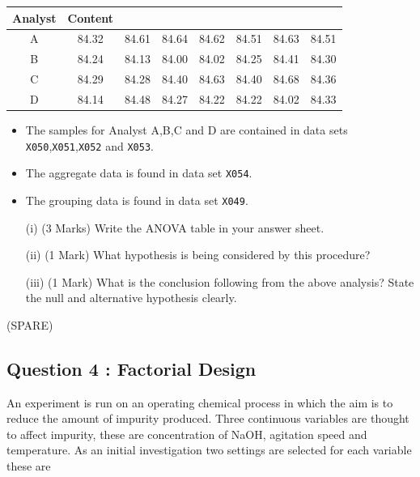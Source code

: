 \documentclass[a4paper,12pt]{article}
\begin{document}
\begin{center}
	\begin{tabular}{|c|ccccccc|}
		\hline
		Analyst	& Content		&		&		&		&		&		&		 \\ \hline
		A	&	84.32	&	84.61	&	84.64	&	84.62	&	84.51	&	84.63	&	84.51	 \\
		B	&	84.24	&	84.13	&	84.00	&	84.02	&	84.25	&	84.41	&	84.30	 \\
		C	&	84.29	&	84.28	&	84.40	&	84.63	&	84.40	&	84.68	&	84.36	 \\
		D	&	84.14	&	84.48	&	84.27	&	84.22	&	84.22	&	84.02	&	84.33	 \\
		\hline
	\end{tabular}
\end{center}
\begin{framed}
\begin{itemize}
\item The samples for Analyst A,B,C and D are contained in data sets \texttt{X050},\texttt{X051},\texttt{X052} and \texttt{X053}.
\item The aggregate data is found in data set \texttt{X054}.
\item The grouping data is found in data set \texttt{X049}.
\end{itemize}
\end{framed}
\medskip
\begin{itemize}
	\item[(i)] (3 Marks) Write the ANOVA table in your answer sheet. 
	\item[(ii)] (1 Mark) What hypothesis is being considered by this procedure?
	\item[(iii)] (1 Mark) What is the conclusion following from the above analysis? State the null and alternative hypothesis clearly.
\end{itemize}
\newpage(SPARE)
\newpage
\subsection*{Question 4 : Factorial Design}
An experiment is run on an operating chemical process in which the aim is to reduce the
amount of impurity produced. Three continuous variables are thought to affect impurity,
these are concentration of NaOH, agitation speed and temperature. As an initial investigation two settings are selected for each variable these are
\end{document}
